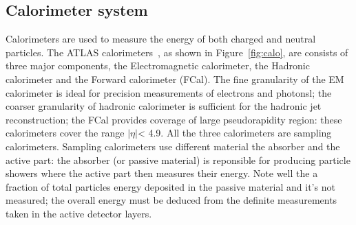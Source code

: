 \subsection{Calorimeter system}

\label{sec:calorimeter}


Calorimeters are used to measure the energy of both charged and neutral particles. 
The ATLAS calorimeters~\cite{ATLAS-TDR-01}, as shown in Figure~\ref{fig:calo},
are consists of three major components,
the Electromagnetic calorimeter, the Hadronic calorimeter and the Forward calorimeter (FCal).
The fine granularity of the EM calorimeter 
is ideal for precision measurements of electrons and photonsl; the
coarser granularity of hadronic calorimeter is sufficient 
for the hadronic jet reconstruction; the FCal provides coverage of 
large pseudorapidity region: these calorimeters cover the range $|\eta|$< 4.9.
All the three calorimeters are sampling calorimeters. Sampling calorimeters 
use different material the absorber and the active part:
the absorber (or passive material) is reponsible for producing particle showers where 
the active part then measures their energy. Note well the a fraction of
total particles energy deposited in the passive material and it's not
measured; the overall energy must be deduced from the definite
measurements taken in the active detector layers. 

